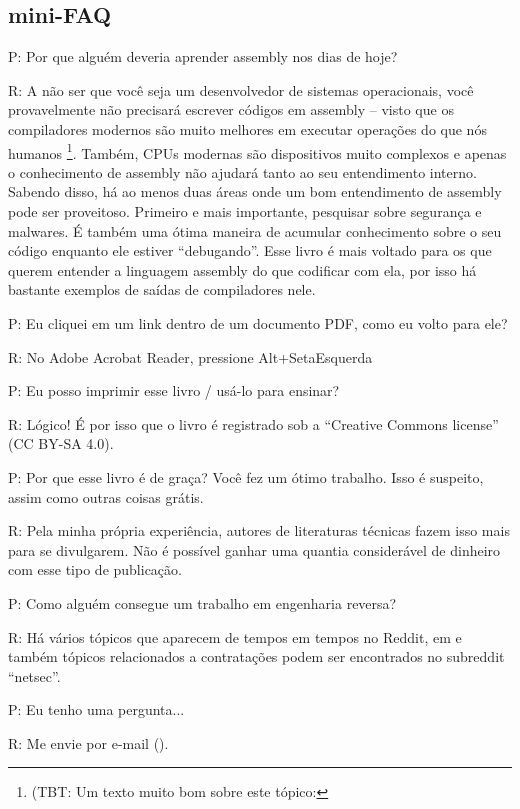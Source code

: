\subsection*{mini-FAQ}


\par P: Por que alguém deveria aprender assembly nos dias de hoje?
\par R: A não ser que você seja um desenvolvedor de sistemas operacionais, você provavelmente não precisará escrever códigos em assembly – visto que os compiladores modernos são muito melhores em executar operações 
do que nós humanos
\footnote{(\ac{TBT}: Um texto muito bom sobre este tópico: \InSqBrackets{\AgnerFog}}.
Também, \ac{CPU}s modernas são dispositivos muito complexos e apenas o conhecimento de assembly não ajudará tanto ao seu entendimento interno. Sabendo disso, há ao menos duas áreas onde um bom entendimento de assembly pode ser proveitoso. Primeiro e mais importante, pesquisar sobre segurança e malwares. É também uma ótima maneira de acumular conhecimento sobre o seu código enquanto ele estiver “debugando”. Esse livro é mais voltado para os que querem entender a linguagem assembly do que codificar com ela, por isso há bastante exemplos de saídas de compiladores nele.

\par P: Eu cliquei em um link dentro de um documento PDF, como eu volto para ele?
\par R: No Adobe Acrobat Reader, pressione Alt+SetaEsquerda

\par P: Eu posso imprimir esse livro / usá-lo para ensinar?
\par R: Lógico! É por isso que o livro é registrado sob a “Creative Commons license” (CC BY-SA 4.0).

\par P: Por que esse livro é de graça? Você fez um ótimo trabalho. Isso é suspeito, assim como outras coisas grátis.
\par R: Pela minha própria experiência, autores de literaturas técnicas fazem isso mais para se divulgarem. Não é possível ganhar uma quantia considerável de dinheiro com esse tipo de publicação.

\par P: Como alguém consegue um trabalho em engenharia reversa?
\par R: Há vários tópicos que aparecem de tempos em tempos no Reddit\FNURLREDDIT{}, em 
e também tópicos relacionados a contratações podem ser encontrados no subreddit ``netsec''.

\par P: Eu tenho uma pergunta...
\par R: Me envie por e-mail (\EMAILS).


